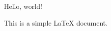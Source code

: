\documentclass{article}
\begin{document}
Hello, world!

This is a simple LaTeX document.
\end{document}

